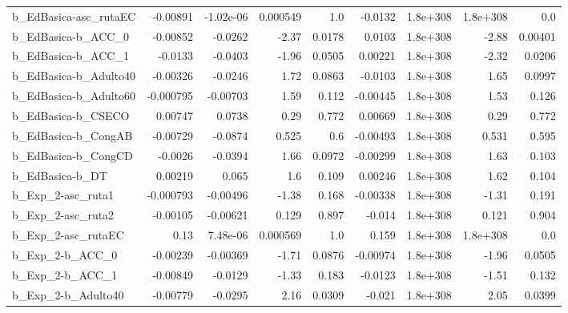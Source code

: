 \begin{tabular}{lrrrrrrrr}
b\_EdBasica-asc\_rutaEC        &    -0.00891 &    -1.02e-06 &  0.000549 &      1.0 &    -0.0132 &    1.8e+308 &     1.8e+308 &           0.0 \\
b\_EdBasica-b\_ACC\_0           &    -0.00852 &      -0.0262 &     -2.37 &   0.0178 &     0.0103 &    1.8e+308 &        -2.88 &       0.00401 \\
b\_EdBasica-b\_ACC\_1           &     -0.0133 &      -0.0403 &     -1.96 &   0.0505 &    0.00221 &    1.8e+308 &        -2.32 &        0.0206 \\
b\_EdBasica-b\_Adulto40        &    -0.00326 &      -0.0246 &      1.72 &   0.0863 &    -0.0103 &    1.8e+308 &         1.65 &        0.0997 \\
b\_EdBasica-b\_Adulto60        &   -0.000795 &     -0.00703 &      1.59 &    0.112 &   -0.00445 &    1.8e+308 &         1.53 &         0.126 \\
b\_EdBasica-b\_CSECO           &     0.00747 &       0.0738 &      0.29 &    0.772 &    0.00669 &    1.8e+308 &         0.29 &         0.772 \\
b\_EdBasica-b\_CongAB          &    -0.00729 &      -0.0874 &     0.525 &      0.6 &   -0.00493 &    1.8e+308 &        0.531 &         0.595 \\
b\_EdBasica-b\_CongCD          &     -0.0026 &      -0.0394 &      1.66 &   0.0972 &   -0.00299 &    1.8e+308 &         1.63 &         0.103 \\
b\_EdBasica-b\_DT              &     0.00219 &        0.065 &       1.6 &    0.109 &    0.00246 &    1.8e+308 &         1.62 &         0.104 \\
b\_Exp\_2-asc\_ruta1            &   -0.000793 &     -0.00496 &     -1.38 &    0.168 &   -0.00338 &    1.8e+308 &        -1.31 &         0.191 \\
b\_Exp\_2-asc\_ruta2            &    -0.00105 &     -0.00621 &     0.129 &    0.897 &     -0.014 &    1.8e+308 &        0.121 &         0.904 \\
b\_Exp\_2-asc\_rutaEC           &        0.13 &     7.48e-06 &  0.000569 &      1.0 &      0.159 &    1.8e+308 &     1.8e+308 &           0.0 \\
b\_Exp\_2-b\_ACC\_0              &    -0.00239 &     -0.00369 &     -1.71 &   0.0876 &   -0.00974 &    1.8e+308 &        -1.96 &        0.0505 \\
b\_Exp\_2-b\_ACC\_1              &    -0.00849 &      -0.0129 &     -1.33 &    0.183 &    -0.0123 &    1.8e+308 &        -1.51 &         0.132 \\
b\_Exp\_2-b\_Adulto40           &    -0.00779 &      -0.0295 &      2.16 &   0.0309 &     -0.021 &    1.8e+308 &         2.05 &        0.0399 \\

\end{tabular}

